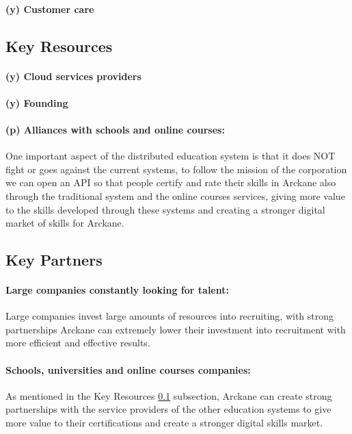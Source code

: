 \paragraph{(y) Customer care}


\subsection{Key Resources}\label{keyresources}

\paragraph{(y) Cloud services providers}

\paragraph{(y) Founding}

\paragraph{(p) Alliances with schools and online courses:} One important aspect of the distributed education system is that it does NOT fight or goes against the current systems, to follow the mission of the corporation we can open an API so that people certify and rate their skills in Arckane also through the traditional system and the online courses services, giving more value to the skills developed through these systems and creating a stronger digital market of skills for Arckane.


\subsection{Key Partners}

\paragraph{Large companies constantly looking for talent:} Large companies invest large amounts of resources into recruiting, with strong partnerships Arckane can extremely lower their investment into recruitment with more efficient and effective results.

\paragraph{Schools, universities and online courses companies:} As mentioned in the Key Resources \ref{keyresources} subsection, Arckane can create strong partnerships with the service providers of the other education systems to give more value to their certifications and create a stronger digital skills market.

